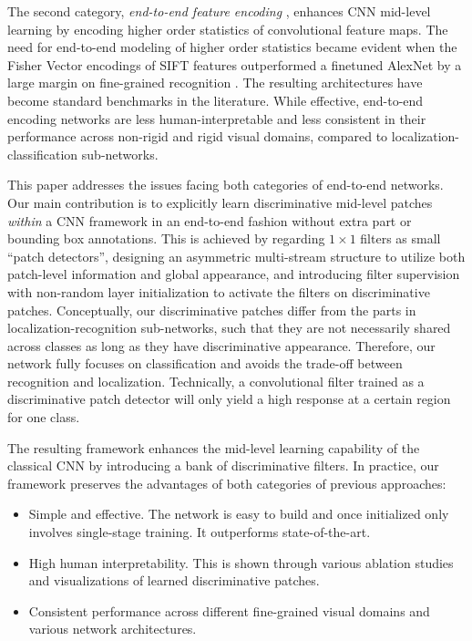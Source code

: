 \documentclass[10pt,twocolumn,letterpaper]{article}
\begin{document}
The second category, \textit{end-to-end feature encoding} \cite{b_cnn, c_b_cnn, lowrank_bcnn, highorder1, highorder2},
enhances CNN mid-level learning by encoding higher order statistics of convolutional feature maps. The need
for end-to-end modeling of higher order statistics became evident when the Fisher Vector encodings of
SIFT features outperformed a finetuned AlexNet by a large margin on fine-grained recognition \cite{fgvcfisher}. The resulting
architectures have become standard benchmarks in the literature. While effective, end-to-end encoding networks are
less human-interpretable and less consistent in their performance across non-rigid
and rigid visual domains, compared to localization-classification sub-networks.

This paper addresses the issues facing both categories of end-to-end networks. Our main contribution is to explicitly learn
discriminative mid-level patches \textit{within} a CNN framework in an end-to-end fashion without extra part or
bounding box annotations. This is achieved by regarding $1\times1$ filters as small ``patch detectors'', designing an asymmetric
multi-stream structure to utilize both patch-level information and global appearance, and introducing filter supervision with
non-random layer initialization to activate the filters on discriminative patches. Conceptually, our discriminative patches
differ from the parts in localization-recognition sub-networks, such that they are not necessarily shared across classes as long as they have
discriminative appearance. Therefore, our network fully focuses on classification and avoids the trade-off between recognition
and localization. Technically, a convolutional filter trained as
a discriminative patch detector will only yield a high response at a certain region for one class.

The resulting framework enhances the mid-level learning capability of the classical CNN by introducing a bank of
discriminative filters. In practice, our framework preserves the
advantages of both categories of previous approaches:
\begin{itemize}[noitemsep, topsep=0pt]
\item Simple and effective. The network is easy to build and once initialized only involves single-stage training. It
outperforms state-of-the-art.
\vspace{2pt}
\item High human interpretability. This is shown through various ablation studies and visualizations of learned
discriminative patches.
\vspace{2pt}
\item Consistent performance across different fine-grained visual domains and various network architectures.
\end{itemize}
\end{document}
